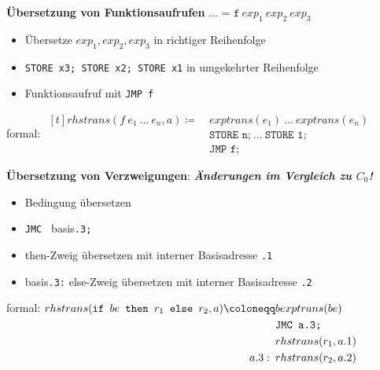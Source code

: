 \documentclass{beamer}
\begin{document}
\begin{frame}
	\footnotesize

	\textbf{Übersetzung von Funktionsaufrufen} $\texttt{... = f} \ {exp_1} \ {exp_2} \ {exp_3}$
	\begin{itemize}
		\item Übersetze $exp_1, exp_2, exp_3$ \hfill in richtiger Reihenfolge
		\item \texttt{STORE x3; STORE x2; STORE x1} \hfill in umgekehrter Reihenfolge
		\item Funktionsaufruf mit \texttt{JMP f}
	\end{itemize}

	formal: $\begin{aligned}[t]
		rhstrans(f \ e_1 \ \dots \ e_n, a) \coloneqq \ &exptrans(e_1) \ \dots \ exptrans(e_n) \\
		&\texttt{STORE n;} \ \dots \ \texttt{STORE 1;} \\
		&\texttt{JMP f;}
	\end{aligned}$
	\pause
	
	\textbf{Übersetzung von Verzweigungen}: 	
	\hfill \alert{\textit{\textbf{Änderungen im Vergleich zu $C_0$!}}}
	\begin{itemize}
		\item Bedingung übersetzen
		\item \texttt{JMC } basis\texttt{.3;}
		\item then-Zweig übersetzen mit interner Basisadresse \texttt{.1}
		\item basis\texttt{.3:} else-Zweig übersetzen mit interner Basisadresse \texttt{.2}
	\end{itemize}
	formal: $\begin{aligned}[t]
		rhstrans(\texttt{if } be \texttt{ then } r_1 \texttt{ else } r_2, a) \coloneqq
		&bexptrans(be) \\
		&\texttt{JMC a.3;} \\
		&rhstrans(r_1, a.1) \\
		a.3: \enskip &rhstrans(r_2, a.2)
	\end{aligned}$
\end{frame}
\end{document}
